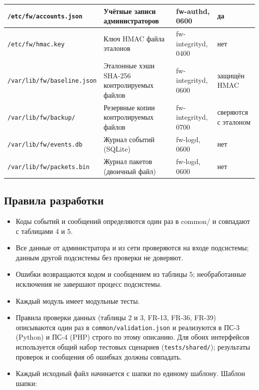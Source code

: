 \documentclass[13pt,a4paper,final]{article}
\begin{document}
\begin{xltabular}{\linewidth}{|p{4.3cm}|X|p{3cm}|p{2.1cm}|}
		\hline
		\texttt{/etc/fw/}\newline\texttt{accounts.json} & Учётные записи администраторов & {fw-authd}, 0600 & да \\
		\hline
		\texttt{/etc/fw/hmac.key} & Ключ HMAC файла эталонов & {fw-integrityd}, 0400 & нет \\
		\hline
		\texttt{/var/lib/fw/}\newline\texttt{baseline.json} & Эталонные хэши SHA-256 контролируемых файлов & {fw-integrityd}, 0600 & защищён HMAC \\
		\hline
		\texttt{/var/lib/fw/backup/} & Резервные копии контролируемых файлов & {fw-integrityd}, 0700 & сверяются с эталоном \\
		\hline
		\texttt{/var/lib/fw/}\newline\texttt{events.db} & Журнал событий (SQLite) & fw-logd, 0600 & нет \\
		\hline
		\texttt{/var/lib/fw/}\newline\texttt{packets.bin} & Журнал пакетов (двоичный файл) & fw-logd, 0600 & нет \\
		\hline
	\end{xltabular}
	\subsection{Правила разработки}

	\begin{itemize}
		\item Коды событий и сообщений определяются один раз в common/ и совпадают с таблицами 4 и 5.
		\item Все данные от администратора и из сети проверяются на входе подсистемы; данным другой подсистемы без проверки не доверяют.
		\item Ошибки возвращаются кодом и сообщением из таблицы 5; необработанные исключения не завершают процесс подсистемы.
		\item Каждый модуль имеет модульные тесты.
		\item Правила проверки данных (таблицы 2 и 3, FR-13, FR-36, FR-39) описываются один раз в \texttt{common/validation.json} и реализуются в ПС-3 (Python) и ПС-4 (PHP) строго по этому описанию. Для обоих интерфейсов используется общий набор тестовых сценариев (\texttt{tests/shared/}); результаты проверок и сообщения об ошибках должны совпадать.
		\item Каждый исходный файл начинается с шапки по единому шаблону. Шаблон шапки:
	\end{itemize}
	
\end{document}
